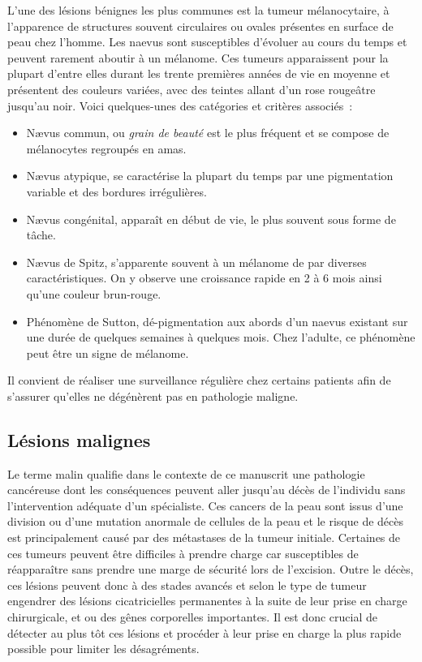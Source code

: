 L'une des lésions bénignes les plus communes est la tumeur mélanocytaire, à l’apparence de structures souvent circulaires ou ovales présentes en surface de peau chez l’homme. Les naevus sont susceptibles d’évoluer au cours du temps et peuvent rarement aboutir à un mélanome. Ces tumeurs apparaissent pour la plupart d'entre elles durant les trente premières années de vie en moyenne et présentent des couleurs variées, avec des teintes allant d'un rose rougeâtre jusqu'au noir. Voici quelques-unes des catégories et critères associés~:
\begin{itemize}
    \item Nævus commun, ou \textit{grain de beauté} est le plus fréquent et se compose de mélanocytes regroupés en amas.
    \item Nævus atypique, se caractérise la plupart du temps par une pigmentation variable et des bordures irrégulières.
    \item Nævus congénital, apparaît en début de vie, le plus souvent sous forme de tâche.
    \item Nævus de Spitz, s’apparente souvent à un mélanome de par diverses caractéristiques. On y observe une croissance rapide en 2 à 6 mois ainsi qu’une couleur brun-rouge.
    \item Phénomène de Sutton, dé-pigmentation aux abords d’un naevus existant sur une durée de quelques semaines à quelques mois. Chez l’adulte, ce phénomène peut être un signe de mélanome.
\end{itemize}
Il convient de réaliser une surveillance régulière chez certains patients afin de s'assurer qu'elles ne dégénèrent pas en pathologie maligne.\par

\subsection{Lésions malignes}
Le terme malin qualifie dans le contexte de ce manuscrit une pathologie cancéreuse dont les conséquences peuvent aller jusqu'au décès de l'individu sans l'intervention adéquate d'un spécialiste. Ces cancers de la peau sont issus d’une division ou d’une mutation anormale de cellules de la peau et le risque de décès est principalement causé par des métastases de la tumeur initiale. Certaines de ces tumeurs peuvent être difficiles à prendre charge car susceptibles de réapparaître sans prendre une marge de sécurité lors de l'excision. Outre le décès, ces lésions peuvent donc à des stades avancés et selon le type de tumeur engendrer des lésions cicatricielles permanentes à la suite de leur prise en charge chirurgicale, et ou des gênes corporelles importantes. Il est donc crucial de détecter au plus tôt ces lésions et procéder à leur prise en charge la plus rapide possible pour limiter les désagréments.\par

